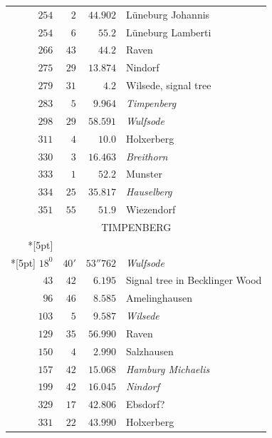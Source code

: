 \begin{longtable}{@{}rrrp{.61\linewidth}@{}}
\(254\)&\(2\)&\(44.902\)&\raggedright Lüneburg Johannis\tabularnewline
\(254\)&\(6\)&\(55.2\)&\raggedright Lüneburg Lamberti\tabularnewline
\(266\)&\(43\)&\(44.2\)&\raggedright Raven\tabularnewline
\(275\)&\(29\)&\(13.874\)&\raggedright Nindorf\tabularnewline
\(279\)&\(31\)&\(4.2\)&\raggedright Wilsede, signal tree\tabularnewline
\(283\)&\(5\)&\(9.964\)&\raggedright \textit{Timpenberg}\tabularnewline
\(298\)&\(29\)&\(58.591\)&\raggedright \textit{Wulfsode}\tabularnewline
\(311\)&\(4\)&\(10.0\)&\raggedright Holxerberg\tabularnewline
\(330\)&\(3\)&\(16.463\)&\raggedright \textit{Breithorn}\tabularnewline
\(333\)&\(1\)&\(52.2\)&\raggedright Munster\tabularnewline
\(334\)&\(25\)&\(35.817\)&\raggedright \textit{Hauselberg}\tabularnewline
\(351\)&\(55\)&\(51.9\)&\raggedright Wiezendorf\tabularnewline
\multicolumn{4}{c}{\strut TIMPENBERG}\\*[5pt]
\multicolumn{4}{c}{\(-177253.420\)\qquad\(-21852.221\)}\\*[5pt]
\(18^{0}\)&\(40'\)&\(53''762\)&\raggedright \textit{Wulfsode}\tabularnewline
\(43\)&\(42\)&\(6.195\)&\raggedright Signal tree in Becklinger Wood\tabularnewline
\(96\)&\(46\)&\(8.585\)&\raggedright Amelinghausen\tabularnewline
\(103\)&\(5\)&\(9.587\)&\raggedright \textit{Wilsede}\tabularnewline
\(129\)&\(35\)&\(56.990\)&\raggedright Raven\tabularnewline
\(150\)&\(4\)&\(2.990\)&\raggedright Salzhausen\tabularnewline
\(157\)&\(42\)&\(15.068\)&\raggedright \textit{Hamburg Michaelis}\tabularnewline
\(199\)&\(42\)&\(16.045\)&\raggedright \textit{Nindorf}\tabularnewline
\(329\)&\(17\)&\(42.806\)&\raggedright Ebsdorf?\tabularnewline
\(331\)&\(22\)&\(43.990\)&\raggedright Holxerberg\tabularnewline
\end{longtable}
\endgroup
